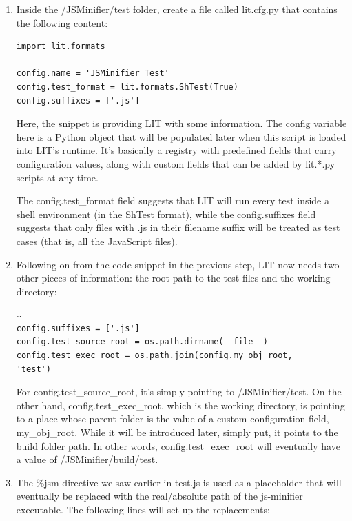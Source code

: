 \begin{enumerate}
\item Inside the /JSMinifier/test folder, create a file called lit.cfg.py that contains the following content:

\begin{lstlisting}[style=stylePython]
import lit.formats

config.name = 'JSMinifier Test'
config.test_format = lit.formats.ShTest(True)
config.suffixes = ['.js']
\end{lstlisting}

Here, the snippet is providing LIT with some information. The config variable here is a Python object that will be populated later when this script is loaded into LIT's runtime. It's basically a registry with predefined fields that carry configuration values, along with custom fields that can be added by lit.*.py scripts at any time.

The config.test\_format field suggests that LIT will run every test inside a shell environment (in the ShTest format), while the config.suffixes field suggests that only files with .js in their filename suffix will be treated as test cases (that is, all the JavaScript files).

\item Following on from the code snippet in the previous step, LIT now needs two other pieces of information: the root path to the test files and the working directory:

\begin{lstlisting}[style=stylePython]
…
config.suffixes = ['.js']
config.test_source_root = os.path.dirname(__file__)
config.test_exec_root = os.path.join(config.my_obj_root,
'test')
\end{lstlisting}

For config.test\_source\_root, it's simply pointing to /JSMinifier/test. On the other hand, config.test\_exec\_root, which is the working directory, is pointing to a place whose parent folder is the value of a custom configuration field, my\_obj\_root. While it will be introduced later, simply put, it points to the build folder path. In other words, config.test\_exec\_root will eventually have a value of /JSMinifier/build/test.

\item The \%jsm directive we saw earlier in test.js is used as a placeholder that will eventually be replaced with the real/absolute path of the js-minifier executable. The following lines will set up the replacements:


\end{enumerate}
